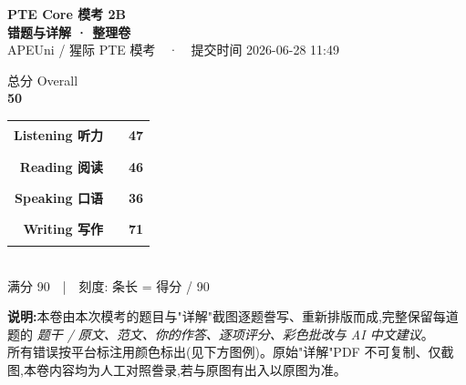 
\begin{titlepage}
\thispagestyle{empty}
\centering
\vspace*{1.4cm}

{\fontsize{30}{36}\selectfont\bfseries\color{cHead} PTE Core 模考 2B}\\[4mm]
{\fontsize{17}{20}\selectfont\color{cAccent}\bfseries 错题与详解 · 整理卷}\\[3mm]
{\color{gray} APEUni / 猩际 PTE 模考　·　提交时间 2026-06-28 11:49}\\[1.2cm]

\begin{tcolorbox}[width=0.62\textwidth, halign=center, enhanced,
  colback=cAccent, colframe=cAccent, arc=6pt, boxrule=0pt, top=10pt, bottom=10pt]
  {\color{white}\large 总分 Overall}\\[2pt]
  {\fontsize{46}{50}\selectfont\bfseries\color{white} 50}
\end{tcolorbox}

\vspace{1.0cm}

\begin{tcolorbox}[width=0.84\textwidth, enhanced, colback=white, colframe=cRule,
  boxrule=0.8pt, arc=4pt, left=18pt, right=18pt, top=14pt, bottom=14pt]
\setlength{\tabcolsep}{6pt}\renewcommand{\arraystretch}{1.7}
\sffamily
\begin{tabular}{@{}r@{\hskip 8pt}l@{\hskip 10pt}l@{}}
 \bfseries Listening 听力 & {\color{mListen}\rule{5.22cm}{0.42cm}} & {\bfseries\large 47}\\
 \bfseries Reading 阅读   & {\color{mRead}\rule{5.11cm}{0.42cm}}   & {\bfseries\large 46}\\
 \bfseries Speaking 口语  & {\color{mSpeak}\rule{4.00cm}{0.42cm}}  & {\bfseries\large 36}\\
 \bfseries Writing 写作   & {\color{mWrite}\rule{7.89cm}{0.42cm}}  & {\bfseries\large 71}\\
\end{tabular}\\[2mm]
{\footnotesize\color{gray} 满分 90　|　刻度: 条长 = 得分 / 90}
\end{tcolorbox}

\vfill
\begin{flushleft}\small\color{gray}
\textbf{说明:}本卷由本次模考的题目与"详解"截图逐题誊写、重新排版而成,完整保留每道题的
\emph{题干 / 原文、范文、你的作答、逐项评分、彩色批改与 AI 中文建议}。\\
所有错误按平台标注用颜色标出(见下方图例)。原始"详解"PDF 不可复制、仅截图,本卷内容均为人工对照誊录,若与原图有出入以原图为准。
\end{flushleft}
\vspace{4mm}
\ptelegend
\end{titlepage}
